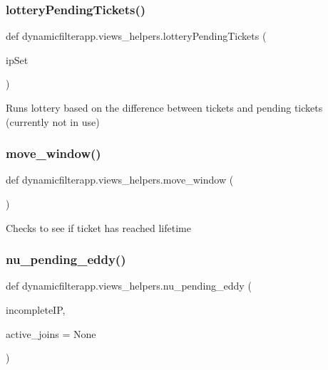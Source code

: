 \subsubsection{\texorpdfstring{lottery\+Pending\+Tickets()}{lotteryPendingTickets()}}
{\footnotesize\ttfamily def dynamicfilterapp.\+views\+\_\+helpers.\+lottery\+Pending\+Tickets (\begin{DoxyParamCaption}\item[{}]{ip\+Set }\end{DoxyParamCaption})}

\begin{DoxyVerb}Runs lottery based on the difference between tickets and pending tickets
(currently not in use)
\end{DoxyVerb}
 \mbox{\label{namespacedynamicfilterapp_1_1views__helpers_aa0f3d2407bfd2bfc1074a0fb2f82a336}} 
\subsubsection{\texorpdfstring{move\+\_\+window()}{move\_window()}}
{\footnotesize\ttfamily def dynamicfilterapp.\+views\+\_\+helpers.\+move\+\_\+window (\begin{DoxyParamCaption}{ }\end{DoxyParamCaption})}

\begin{DoxyVerb}Checks to see if ticket has reached lifetime
\end{DoxyVerb}
 \mbox{\label{namespacedynamicfilterapp_1_1views__helpers_a0166128faa543e6b533e3fc103de243b}} 
\subsubsection{\texorpdfstring{nu\+\_\+pending\+\_\+eddy()}{nu\_pending\_eddy()}}
{\footnotesize\ttfamily def dynamicfilterapp.\+views\+\_\+helpers.\+nu\+\_\+pending\+\_\+eddy (\begin{DoxyParamCaption}\item[{}]{incomplete\+IP,  }\item[{}]{active\+\_\+joins = {\ttfamily None} }\end{DoxyParamCaption})}

